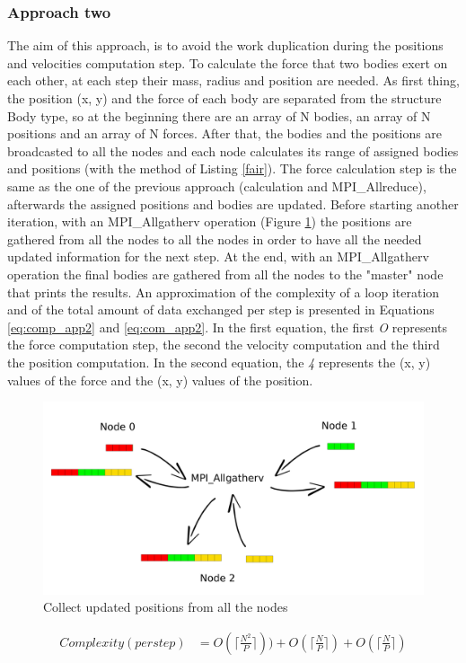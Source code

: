 \documentclass[a4paper]{article}
\begin{document}
\subsubsection{Approach two}
\label{sec:app_1}
The aim of this approach, is to avoid the work duplication during the positions and velocities computation step. To calculate the force that two bodies exert on each other, at each step their mass, radius and position are needed. As first thing, the position (x, y) and the force of each body are separated from the structure Body type, so at the beginning there are an array of N bodies, an array of N positions and an array of N forces. 
After that, the bodies and the positions are broadcasted to all the nodes and each node calculates its range of assigned bodies and positions (with the method of Listing \ref{fair}).
The force calculation step is the same as the one of the previous approach (calculation and MPI\_Allreduce), afterwards the assigned positions and bodies are updated. Before starting another iteration, with an MPI\_Allgatherv operation (Figure \ref{fig:posi}) the positions are gathered from all the nodes to all the nodes in order to have all the needed updated information for the next step. At the end, with an MPI\_Allgatherv operation the final bodies are gathered from all the nodes to the "master" node that prints the results.
An approximation of the complexity of a loop iteration and of the total amount of data exchanged per step is presented in Equations \ref{eq:comp_app2} and \ref{eq:com_app2}. In the first equation, the first \textit{O} represents the force computation step, the second the velocity computation and the third the position computation. In the second equation, the \textit{4} represents the (x, y) values of the force and the (x, y) values of the position.


\begin{figure}[ht]
  \centering
  \includegraphics[width=0.6\linewidth]{MPI_all_gather}
  \caption{Collect updated positions from all the nodes}
  \label{fig:posi}
\end{figure}
\FloatBarrier


\begin{equation} \label{eq:comp_app2}
\begin{split}
Complexity (per step) & = O(\lceil\frac{N^2}{P}\rceil)) + O(\lceil\frac{N}{P}\rceil) + O(\lceil\frac{N}{P}\rceil)
\end{split}
\end{equation}
\end{document}
